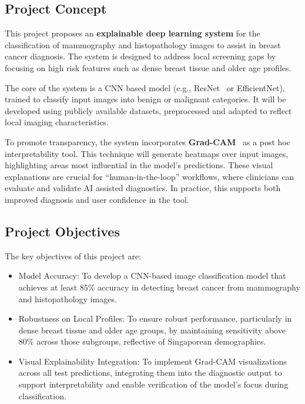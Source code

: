 \documentclass[12pt]{article}
\begin{document}
\subsection{Project Concept}
This project proposes an \textbf{explainable deep learning system} for the classification of mammography and histopathology images to assist in breast cancer diagnosis. The system is designed to address local screening gaps by focusing on high risk features such as dense breast tissue and older age profiles.

The core of the system is a CNN based model (e.g., ResNet~\cite{17} or EfficientNet), trained to classify input images into benign or malignant categories. It will be developed using publicly available datasets, preprocessed and adapted to reflect local imaging characteristics.

To promote transparency, the system incorporates \textbf{Grad-CAM}~\cite{5} as a post hoc interpretability tool. This technique will generate heatmaps over input images, highlighting areas most influential in the model’s predictions. These visual explanations are crucial for ``human-in-the-loop'' workflows, where clinicians can evaluate and validate AI assisted diagnostics. In practice, this supports both improved diagnosis and user confidence in the tool.

\subsection{Project Objectives}
\label{sec:objectives}
The key objectives of this project are:
\begin{itemize}
    \item {Model Accuracy:} To develop a CNN-based image classification model that achieves at least {85\% accuracy} in detecting breast cancer from mammography and histopathology images.
    \item {Robustness on Local Profiles:} To ensure robust performance, particularly in {dense breast tissue and older age groups}, by maintaining {sensitivity above 80\%} across those subgroups, reflective of Singaporean demographics.
    \item {Visual Explainability Integration:} To implement {Grad-CAM visualizations} across all test predictions, integrating them into the diagnostic output to support interpretability and enable verification of the model’s focus during classification.
\end{itemize}
\end{document}
